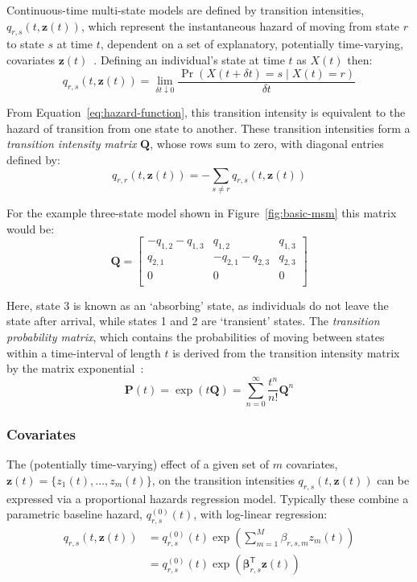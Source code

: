 Continuous-time multi-state models are defined by transition intensities, $q_{r,s}(t, \bm{z}(t))$, which represent the instantaneous hazard of moving from state $r$ to state $s$ at time $t$, dependent on a set of explanatory, potentially time-varying, covariates $\bm{z}(t)$~\parencite{Putter2007-kb}. Defining an individual's state at time $t$ as $X(t)$ then:
%
\begin{equation}
    q_{r,s}(t, \bm{z}(t)) = \lim_{\delta t\downarrow 0}\frac{\Pr(X(t+\delta t)=s \mid X(t)=r)}{\delta t}
    \label{eq:transition-intensity}
\end{equation}

From Equation~\ref{eq:hazard-function}, this transition intensity is equivalent to the hazard of transition from one state to another. These transition intensities form a \textit{transition intensity matrix} $\mathbf{Q}$, whose rows sum to zero, with diagonal entries defined by:
%
\[
    q_{r,r}(t, \bm{z}(t)) = - \sum_{s \neq r} q_{r,s}(t, \bm{z}(t))
\]

For the example three-state model shown in Figure~\ref{fig:basic-msm} this matrix would be:
%
\[
    \mathbf{Q} = \begin{bmatrix}
        -q_{1,2}-q_{1,3} & q_{1,2}          & q_{1,3} \\
        q_{2,1}          & -q_{2,1}-q_{2,3} & q_{2,3} \\
        0                & 0                & 0       \\
    \end{bmatrix}
\]

Here, state 3 is known as an `absorbing' state, as individuals do not leave the state after arrival, while states 1 and 2 are `transient' states. The \textit{transition probability matrix}, which contains the probabilities of moving between states within a time-interval of length $t$ is derived from the transition intensity matrix by the matrix exponential~\parencite{van-den-Hout2016-xy}:
%
\[
    \mathbf{P}(t) = \exp(t\mathbf{Q}) = \sum_{n=0}^{\infty}\frac{t^n}{n!}\mathbf{Q}^n
\]

\subsubsection{Covariates}

The (potentially time-varying) effect of a given set of $m$ covariates, $\bm{z}(t) = \{z_1(t), \ldots, z_m(t)\}$, on the transition intensities $q_{r,s}(t, \bm{z}(t))$ can be expressed via a proportional hazards regression model. Typically these combine a parametric baseline hazard, $q^{(0)}_{r,s}(t)$, with log-linear regression:
%
\begin{align*}
    q_{r,s}(t, \bm{z}(t)) & = q^{(0)}_{r,s}(t)\exp\left(\sum_{m=1}^{M}\beta_{r,s,m}z_{m}(t)\right)  \\
                          & = q^{(0)}_{r,s}(t)\exp\left(\bm{\beta}_{r,s}^\mathsf{T}\bm{z}(t)\right)
\end{align*}

